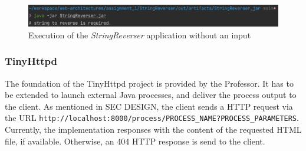 \documentclass{article}
\begin{document}
\begin{figure}[h]
\centering
\includegraphics[scale=0.4]{images/StringReverserExecFail}
\caption{Execution of the \textit{StringReverser} application without an input}
\label{fig:01_part1_impl_stringreverser_execution_fail}
\end{figure}

\subsubsection{TinyHttpd}
The foundation of the TinyHttpd project is provided by the Professor. It has to be extended to launch external Java processes, and deliver the process output to the client. As mentioned in SEC DESIGN, the client sends a HTTP request via the URL \texttt{http://localhost:8000/process/PROCESS\_NAME?PROCESS\_PARAMETERS}. Currently, the implementation responses with the content of the requested HTML file, if available. Otherwise, an 404 HTTP response is send to the client.
\end{document}
